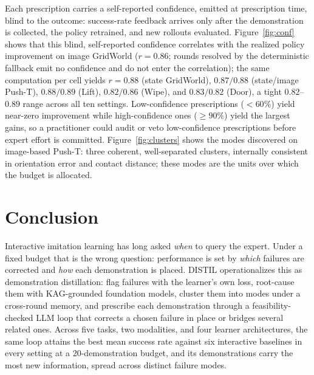 \documentclass[letterpaper]{article} %
\begin{document}
Each prescription carries a self-reported confidence, emitted at
prescription time, blind to the outcome: success-rate feedback arrives only
after the demonstration is collected, the policy retrained, and new
rollouts evaluated. Figure~\ref{fig:conf} shows that this blind,
self-reported confidence correlates with the realized policy improvement on
image GridWorld ($r=0.86$; rounds resolved by the deterministic fallback
emit no confidence and do not enter the correlation); the same computation per cell yields $r=0.88$
(state GridWorld), $0.87/0.88$ (state/image Push-T), $0.88/0.89$ (Lift),
$0.82/0.86$ (Wipe), and $0.83/0.82$ (Door), a tight $0.82$--$0.89$ range
across all ten settings. Low-confidence
prescriptions ($<60\%$) yield near-zero improvement while high-confidence
ones ($\ge 90\%$) yield the largest gains, so a practitioner could audit or
veto low-confidence prescriptions before expert effort is committed.
Figure~\ref{fig:clusters} shows the modes discovered on image-based Push-T:
three coherent, well-separated clusters, internally consistent in
orientation error and contact distance; these modes are the units over
which the budget is allocated.

\section{Conclusion}
\label{sec:conclusion}

Interactive imitation learning has long asked \emph{when} to query the
expert. Under a fixed budget that is the wrong question: performance is set
by \emph{which} failures are corrected and \emph{how} each demonstration is
placed. DISTIL operationalizes this as demonstration distillation: flag
failures with the learner's own loss, root-cause them with KAG-grounded
foundation models, cluster them into modes under a cross-round memory, and
prescribe each demonstration through a feasibility-checked LLM loop that
corrects a chosen failure in place or bridges several related ones.
Across five tasks, two modalities, and four learner architectures, the
same loop attains the best mean success rate against six interactive
baselines in every setting at a 20-demonstration budget, and its
demonstrations carry the most new information, spread across distinct
failure modes.
\end{document}

